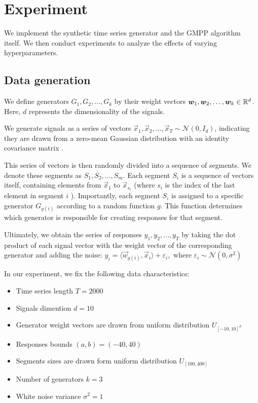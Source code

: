 \documentclass[12pt, twoside]{article}
\begin{document}
\section{Experiment}
We implement the synthetic time series generator and the GMPP algorithm itself. 
We then conduct experiments to analyze the effects of varying hyperparameters.
\subsection{Data generation}

We define generators $G_1, G_2, \dots, G_k$ by their weight vectors $\boldsymbol{w}_1, \boldsymbol{w}_2, \dots, \boldsymbol{w}_k \in \mathbb{R}^d$. 
Here, $d$ represents the dimensionality of the signals.

We generate signals as a series of vectors $\vec x_1, \vec x_2, \dots, \vec x_T \sim \mathcal{N}(0, I_d)$, indicating they are drawn from a zero-mean Gaussian distribution with an identity covariance matrix .

This series of vectors is then randomly divided into a sequence of segments. 
We denote these segments as $S_1, S_2, \dots, S_m$. 
Each segment $S_i$ is a sequence of vectors itself, containing elements from $\vec x_1$ to $\vec x_{s_i}$ (where $s_i$ is the index of the last element in segment $i$ ). 
Importantly, each segment $S_i$ is assigned to a specific generator $G_{g(i)}$ according to a random function $g$. 
This function determines which generator is responsible for creating responses for that segment.

Ultimately, we obtain the series of responses $y_1, y_2, \dots, y_T$ by taking the dot product of each signal vector with the weight vector of the corresponding  generator and adding the noise: $y_i = \langle \vec w_{g(i)}, \vec x_i \rangle + \varepsilon_i,$ where $\varepsilon_i \sim \mathcal{N}(0, \sigma^2)$ 

\vspace{2mm}

In our experiment, we fix the following data characteristics:
\begin{itemize}
\item Time series length $T = 2000$
\item Signals dimention $d=10$
\item Generator weight vectors are drawn from uniform distribution $U_{[-10, 10]^d}$
\item Responses bounds $(a, b) = (-40, 40)$
\item Segments sizes are drawn form uniform distribution $U_{[100, 400]}$
\item Number of generators $k = 3$
\item White noise variance $\sigma^2= 1$
\end{itemize}
\end{document}
